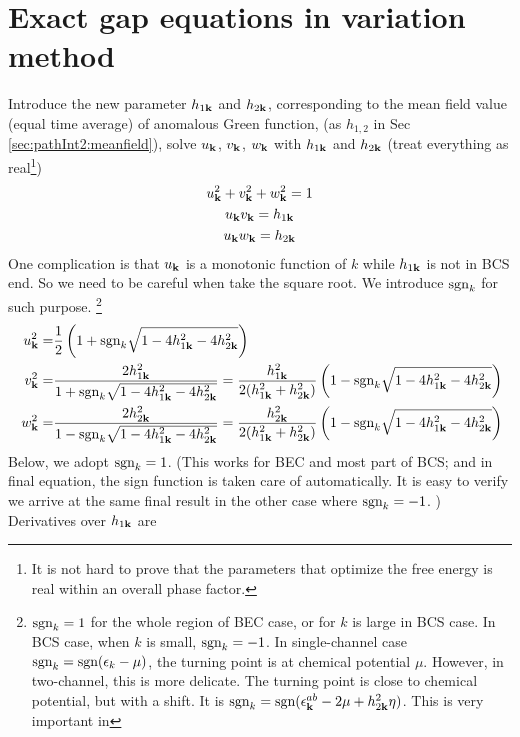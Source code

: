  \section{Exact gap equations in variation method}
Introduce the new parameter $h_{1\mathbf{k}}$ and $h_{2\mathbf{k}}$, corresponding to the mean field value (equal time average) of anomalous Green function,  (as $h_{1,2}$  in Sec \ref{sec:pathInt2:meanfield}), solve $u_{\mathbf{k}}$, $v_{\mathbf{k}}$, $w_{\mathbf{k}}$ with $h_{1\mathbf{k}}$ and $h_{2\mathbf{k}}$ (treat everything as real\footnote{It is not hard to prove that the parameters that optimize the free energy is real within an overall phase factor. })
\begin{gather}
u_{\mathbf{k}}^2+v^{2}_{\mathbf{k}}+w^{2}_{\mathbf{k}}=1\\
u_{\mathbf{k}}v_{\mathbf{k}}=h_{1\mathbf{k}}\\
u_{\mathbf{k}}w_{\mathbf{k}}=h_{2\mathbf{k}}
\end{gather}
One complication is that $u_{\mathbf{k}}$ is a monotonic function of $k$ while $h_{1\mathbf{k}}$ is not in BCS end.  So we need to be careful when take the square root.  We introduce $\text{sgn}_k$ for such purpose.  \footnote{\label{foot:20100909:sgn} $\text{sgn}_k=1$  for the whole region of BEC case, or for $k$ is large in BCS case. In BCS case, when $k$ is small, $\text{sgn}_{k}=-1$.  In single-channel case $\text{sgn}_{k}=\text{sgn}(\epsilon_{k}-\mu)$, the turning point is at chemical potential $\mu$.  However, in two-channel, this is more delicate.  The turning point is close to chemical potential, but with a shift. It is $\text{sgn}_k=\text{sgn}(\epsilon^{ab}_{\mathbf{k}}-2\mu+  h_{2\mathbf{k}}^2\eta)$.  This is very important in }
\begin{equation}
\begin{split}
u_{\mathbf{k}}^2=&\frac{1}{2} \left(1+\text{sgn}_{k}\sqrt{1-4 h_{1\mathbf{k}}^2-4 h_{2\mathbf{k}}^2}\right)\\
v^{2}_{\mathbf{k}}=&\frac{2 h_{1\mathbf{k}}^2}{1+\text{sgn}_{k}\sqrt{1-4 h_{1\mathbf{k}}^2-4 h_{2\mathbf{k}}^2}}
=\frac{ h_{1\mathbf{k}}^2}{2( h_{1\mathbf{k}}^2+ h_{2\mathbf{k}}^2)} \left(1-\text{sgn}_{k}\sqrt{1-4 h_{1\mathbf{k}}^2-4 h_{2\mathbf{k}}^2}\right)\\\
w^{2}_{\mathbf{k}}=&\frac{2 h_{2\mathbf{k}}^2}{1-\text{sgn}_{k}\sqrt{1-4 h_{1\mathbf{k}}^2-4 h_{2\mathbf{k}}^2}}
=\frac{h_{2\mathbf{k}}^2}{2( h_{1\mathbf{k}}^2+ h_{2\mathbf{k}}^2)} \left(1-\text{sgn}_{k}\sqrt{1-4 h_{1\mathbf{k}}^2-4 h_{2\mathbf{k}}^2}\right)
\end{split}
\end{equation}
Below, we adopt $\text{sgn}_k=1$. (This works for BEC and most part of BCS; and in final equation, the sign function is taken care of automatically.  It is easy to verify we arrive at the same final result in the other case where $\text{sgn}_{k}=-1$. ) Derivatives over $h_{1\mathbf{k}}$ are
